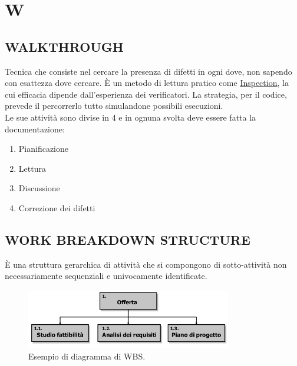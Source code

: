 \newpage
	\section{W} \label{sec:W}
		\subsection{WALKTHROUGH}  \label{walkthrough} %
		Tecnica che consiste nel cercare la presenza di difetti in ogni dove, non sapendo con esattezza dove cercare. È un metodo di lettura pratico come \underline{\hyperref[inspection]{Inspection}}, la cui efficacia dipende dall'esperienza dei verificatori. La strategia, per il codice, prevede il percorrerlo tutto simulandone possibili esecuzioni. \\
		Le sue attività sono divise in 4 e in ognuna svolta deve essere fatta la documentazione:
		\begin{enumerate}
			\item Pianificazione
			\item Lettura
			\item Discussione
			\item Correzione dei difetti
		\end{enumerate}

		\subsection{WORK BREAKDOWN STRUCTURE}  \label{wbs}
		È una struttura gerarchica di attività che si compongono di sotto-attività non necessariamente sequenziali e univocamente identificate.

		\begin{figure}[H]
			\centering
			\includegraphics[width=0.8\textwidth]{img/wbs}
			\caption{Esempio di diagramma di WBS.}
		\end{figure}
